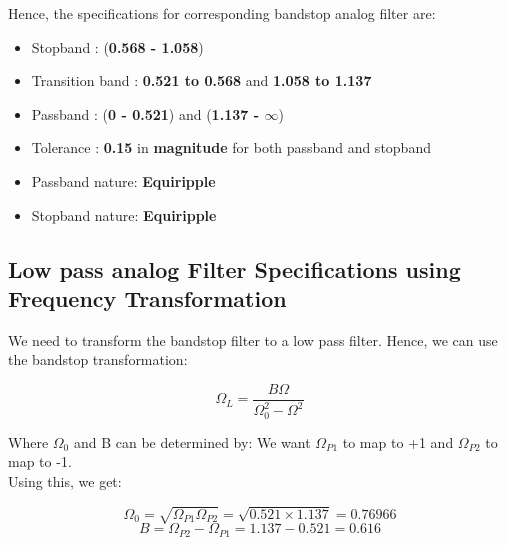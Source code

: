 \documentclass{article}
\begin{document}
Hence, the specifications for corresponding bandstop analog filter are:
\begin{itemize}
    \item Stopband : (\textbf{0.568 -  1.058})
    \item  Transition band : \textbf{0.521 to 0.568} and \textbf{1.058 to 1.137}
    \item Passband : (\textbf{0 - 0.521}) and (\textbf{1.137 - $\infty$})
    \item  Tolerance : \textbf{0.15} in \textbf{magnitude} for both passband and stopband
    \item Passband nature: \textbf{Equiripple}
    \item Stopband nature: \textbf{Equiripple}
\end{itemize}

\subsection{Low pass analog Filter Specifications using Frequency
Transformation}

We need to transform the bandstop filter to a low pass filter. Hence, we can use the bandstop transformation:
\vspace{-5mm}
\begin{center}
    \begin{equation*}
        \Omega_L = \frac{B\Omega}{\Omega_0^2-\Omega^2}
    \end{equation*}
\end{center}

Where $\Omega_0$ and B can be determined by:
We want $\Omega_{P1}$ to map to +1 and $\Omega_{P2}$ to map to -1.\\
Using this, we get:
\begin{center}
    \begin{equation*}
        \Omega_0 = \sqrt{\Omega_{P1}\Omega_{P2}} = \sqrt{0.521 \times 1.137} = 0.76966
    \end{equation*}
    \begin{equation*}
        B = \Omega_{P2} - \Omega_{P1} = 1.137 - 0.521 = 0.616
    \end{equation*}
\end{center}
\end{document}
